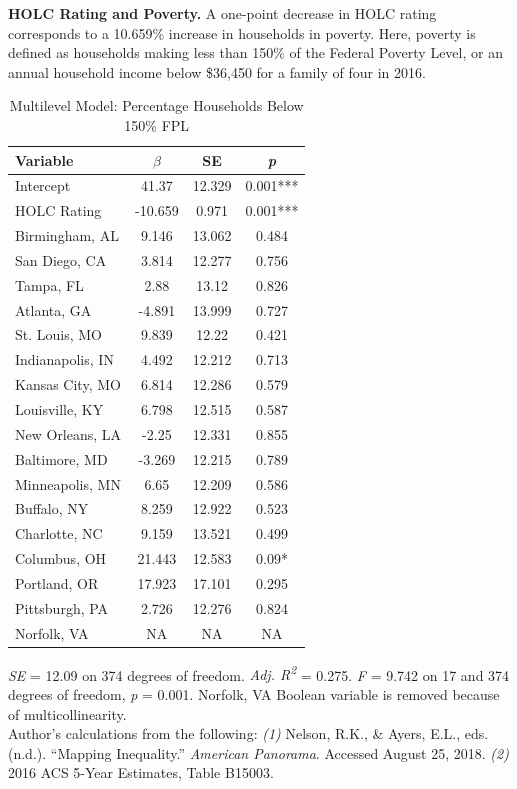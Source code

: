 \documentclass[paper=letter, fontsize=12pt]{scrartcl} %
\begin{document}
\begin{table}
	\textbf{HOLC Rating and Poverty.} A one-point decrease in HOLC rating corresponds to a 10.659\% increase in households in poverty. Here, poverty is defined as households making less than 150\% of the Federal Poverty Level, or an annual household income below \$36,450 for a family of four in 2016.
	\caption{Multilevel Model: Percentage Households Below 150\% FPL}
	\begin{center}
		\begin{tabular}{|| l | c c c ||}
			\hline
			Variable & $\beta$ & SE & \textit{p}\\
			\hline \hline
			Intercept & 41.37 & 12.329 & 0.001***\\ 
			\hline 
			HOLC Rating & -10.659 & 0.971 & 0.001***\\ 
			\hline 
			Birmingham, AL & 9.146 & 13.062 & 0.484\\ 
			\hline 
			San Diego, CA & 3.814 & 12.277 & 0.756\\ 
			\hline 
			Tampa, FL & 2.88 & 13.12 & 0.826\\ 
			\hline 
			Atlanta, GA & -4.891 & 13.999 & 0.727\\ 
			\hline 
			St. Louis, MO & 9.839 & 12.22 & 0.421\\ 
			\hline 
			Indianapolis, IN & 4.492 & 12.212 & 0.713\\ 
			\hline 
			Kansas City, MO & 6.814 & 12.286 & 0.579\\ 
			\hline 
			Louisville, KY & 6.798 & 12.515 & 0.587\\ 
			\hline 
			New Orleans, LA & -2.25 & 12.331 & 0.855\\ 
			\hline 
			Baltimore, MD & -3.269 & 12.215 & 0.789\\ 
			\hline 
			Minneapolis, MN & 6.65 & 12.209 & 0.586\\ 
			\hline 
			Buffalo, NY & 8.259 & 12.922 & 0.523\\ 
			\hline 
			Charlotte, NC & 9.159 & 13.521 & 0.499\\ 
			\hline 
			Columbus, OH & 21.443 & 12.583 & 0.09*\\ 
			\hline 
			Portland, OR & 17.923 & 17.101 & 0.295\\ 
			\hline 
			Pittsburgh, PA & 2.726 & 12.276 & 0.824\\ 
			\hline 
			Norfolk, VA & NA & NA & NA\\ 
			\hline
		\end{tabular}
	\end{center}
\textit{SE} = 12.09 on 374 degrees of freedom. \textit{Adj. R\textsuperscript{2}} = 0.275. \textit{F} = 9.742 on 17 and 374 degrees of freedom, \textit{p} = 0.001. Norfolk, VA Boolean variable is removed because of multicollinearity.\\
Author's calculations from the following: \textit{(1)} Nelson, R.K., \& Ayers, E.L., eds. (n.d.). ``Mapping Inequality.'' \textit{American Panorama}. Accessed August 25, 2018. \textit{(2)} 2016 ACS 5-Year Estimates, Table B15003.
\end{table}
\end{document}
